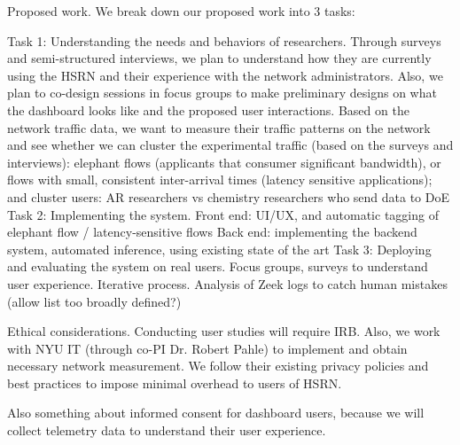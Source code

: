 Proposed work. We break down our proposed work into 3 tasks:

Task 1: Understanding the needs and behaviors of researchers.
Through surveys and semi-structured interviews, we plan to understand how they are currently using the HSRN and their experience with the network administrators. Also, we plan to co-design sessions in focus groups to make preliminary designs on what the dashboard looks like and the proposed user interactions.
Based on the network traffic data, we want to measure their traffic patterns on the network and see whether we can cluster the experimental traffic (based on the surveys and interviews): elephant flows (applicants that consumer significant bandwidth), or flows with small, consistent inter-arrival times (latency sensitive applications); and cluster users: AR researchers vs chemistry researchers who send data to DoE
Task 2: Implementing the system.
Front end: UI/UX, and automatic tagging of elephant flow / latency-sensitive flows
Back end: implementing the backend system, automated inference, using existing state of the art
Task 3: Deploying and evaluating the system on real users.
Focus groups, surveys to understand user experience. Iterative process.
Analysis of Zeek logs to catch human mistakes (allow list too broadly defined?)

Ethical considerations. Conducting user studies will require IRB. Also, we work with NYU IT (through co-PI Dr. Robert Pahle) to implement and obtain necessary network measurement. We follow their existing privacy policies and best practices to impose minimal overhead to users of HSRN.

Also something about informed consent for dashboard users, because we will collect telemetry data to understand their user experience.

